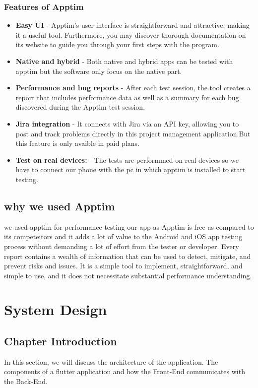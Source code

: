 \subsection{Features of Apptim}
\begin{itemize}
    \item \textbf{Easy UI} - Apptim's user interface is straightforward and attractive, making it a useful tool. Furthermore, you may discover thorough documentation on its website to guide you through your first steps with the program.
    \item \textbf{Native and hybrid} - Both native and hybrid apps can be tested with apptim but the software only focus on the native part.
    \item \textbf{Performance and bug reports} - After each test session, the tool creates a report that includes performance data as well as a summary for each bug discovered during the Apptim test session.
    \item \textbf{Jira integration} - It connects with Jira via an API key, allowing you to post and track problems directly in this project management application.But this feature is only avaible in paid plans.
    \item \textbf{Test on real devices:} - The tests are performmed on real devices so we have to connect our phone with the pc in which apptim is installed to start testing.
\end{itemize}
\section{why we used Apptim}
we used apptim for performance testing our app as Apptim is free as compared to its competeitors and it adds a lot of value to the Android and iOS app testing process without demanding a lot of effort from the tester or developer.
Every report contains a wealth of information that can be used to detect, mitigate, and prevent risks and issues.
It is a simple tool to implement, straightforward, and simple to use, and it does not necessitate substantial performance understanding.
\chapter{System Design}

\section{Chapter Introduction}
In this section, we will discuss the architecture of the application. The
components of a flutter application and how the Front-End communicates with the Back-End.

